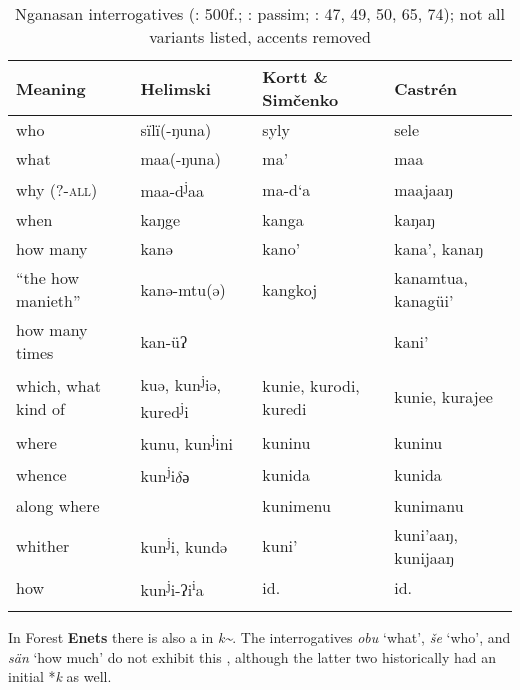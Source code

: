 \begin{table}
\caption{Nganasan interrogatives (\citealt{Helimski1998}: 500f.; \citealt{Kortt1985}: passim; \citealt{Castrén1855}: 47, 49, 50, 65, 74); not all variants listed, accents removed}
\label{tab:ural:4}

\begin{tabularx}{\textwidth}{lQQQ}
\lsptoprule

\textbf{Meaning} & \textbf{Helimski} & \textbf{Kortt \& Simčenko} & \textbf{Castrén}\\
\midrule
who & sïlï(-ŋuna) & syly & sele\\
what & maa(-ŋuna) & ma’ & maa\\
why (?-\textsc{all}) & maa-d\textsuperscript{j}aa & ma-d‘a & maajaaŋ\\
when & kaŋge & kanga & kaŋaŋ\\
how many & kanə & kano’ & kana’, kanaŋ\\
“the how manieth” & kanə-mtu(ə) & kangkoj & kanamtua, kanagüi’\\
how many times & kan-üʔ &  & kani’\\
which, what kind of & kuə, kun\textsuperscript{j}iə, kured\textsuperscript{j}i & kunie, kurodi, kuredi & kunie, kurajee\\
where & kunu, kun\textsuperscript{j}ini & kuninu & kuninu\\
whence & kun\textsuperscript{j}i$\delta ə$ & kunida & kunida\\
along where &  & kunimenu & kunimanu\\
whither & kun\textsuperscript{j}i, kundə & kuni’ & kuni’aaŋ, kunijaaŋ\\
how & kun\textsuperscript{j}i-ʔi\textsuperscript{i}a & id. & id.\\
\lspbottomrule
\end{tabularx}
\end{table}

In Forest \textbf{Enets} there is also a  in \textit{k{\textasciitilde}}. The interrogatives \textit{obu} ‘what’, \textit{še} ‘who’, and \textit{sän} ‘how much’ do not exhibit this , although the latter two historically had an initial *\textit{k} as well.

